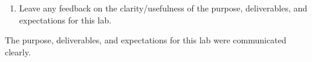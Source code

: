 \documentclass[12pt]{article}
\begin{document}
\begin{enumerate}[resume]
    \item Leave any feedback on the clarity/usefulness of the purpose, deliverables, and expectations for this lab.
\end{enumerate}
    \par The purpose, deliverables, and expectations for this lab were communicated clearly.
\end{document}
